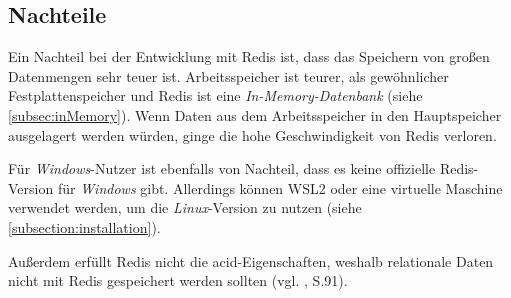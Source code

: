 
\subsection{Nachteile}

Ein Nachteil bei der Entwicklung mit \ac{Redis} ist, dass das Speichern von großen Datenmengen sehr teuer ist. Arbeitsspeicher ist teurer, als gewöhnlicher Festplattenspeicher und \ac{Redis} ist eine \textit{In-Memory-Datenbank} (siehe \autoref{subsec:inMemory}). Wenn Daten aus dem Arbeitsspeicher in den Hauptspeicher ausgelagert werden würden, ginge die hohe Geschwindigkeit von \ac{Redis} verloren. 

Für \textit{Windows}-Nutzer ist ebenfalls von Nachteil, dass es keine offizielle \ac{Redis}-Version für \textit{Windows} gibt. Allerdings können \ac{WSL2} oder eine virtuelle Maschine verwendet werden, um die \textit{Linux}-Version zu nutzen (siehe \autoref{subsection:installation}).

Außerdem erfüllt \ac{Redis} nicht die \gls{acid}-Eigenschaften, weshalb relationale Daten nicht mit \ac{Redis} gespeichert werden sollten (vgl. \cite{nosql}, S.91).